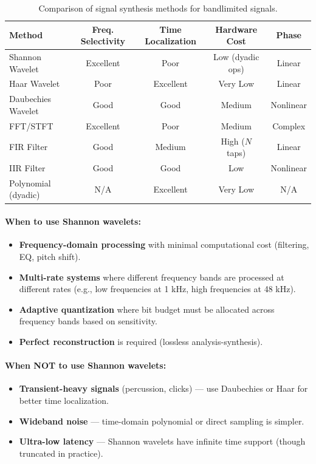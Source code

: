 \begin{table}[h]
\centering
\small
\begin{tabular}{|l|c|c|c|c|}
\hline
\textbf{Method} & \textbf{Freq. Selectivity} & \textbf{Time Localization} & \textbf{Hardware Cost} & \textbf{Phase} \\ \hline
Shannon Wavelet & Excellent & Poor & Low (dyadic ops) & Linear \\ \hline
Haar Wavelet & Poor & Excellent & Very Low & Linear \\ \hline
Daubechies Wavelet & Good & Good & Medium & Nonlinear \\ \hline
FFT/STFT & Excellent & Poor & Medium & Complex \\ \hline
FIR Filter & Good & Medium & High ($N$ taps) & Linear \\ \hline
IIR Filter & Good & Good & Low & Nonlinear \\ \hline
Polynomial (dyadic) & N/A & Excellent & Very Low & N/A \\ \hline
\end{tabular}
\caption{Comparison of signal synthesis methods for bandlimited signals.}
\end{table}

\paragraph{When to use Shannon wavelets:}
\begin{itemize}
\item \textbf{Frequency-domain processing} with minimal computational cost (filtering, EQ, pitch shift).
\item \textbf{Multi-rate systems} where different frequency bands are processed at different rates (e.g., low frequencies at 1 kHz, high frequencies at 48 kHz).
\item \textbf{Adaptive quantization} where bit budget must be allocated across frequency bands based on sensitivity.
\item \textbf{Perfect reconstruction} is required (lossless analysis-synthesis).
\end{itemize}

\paragraph{When NOT to use Shannon wavelets:}
\begin{itemize}
\item \textbf{Transient-heavy signals} (percussion, clicks) — use Daubechies or Haar for better time localization.
\item \textbf{Wideband noise} — time-domain polynomial or direct sampling is simpler.
\item \textbf{Ultra-low latency} — Shannon wavelets have infinite time support (though truncated in practice).
\end{itemize}

